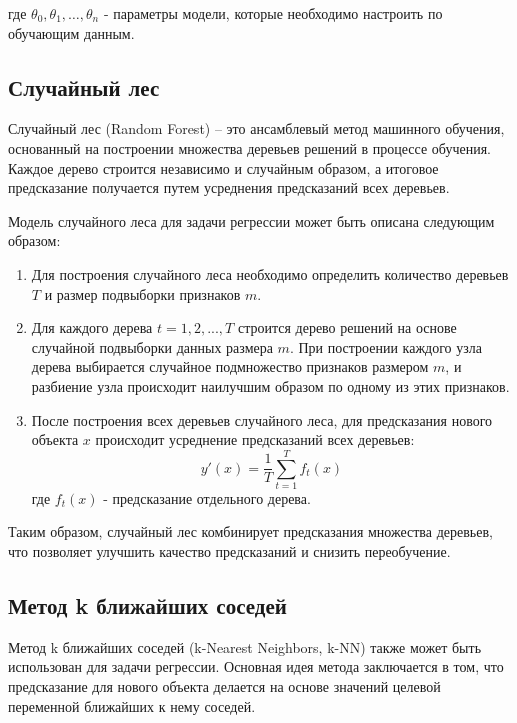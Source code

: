  где $θ_0, θ_1, …, θ_n$ - параметры модели, которые необходимо настроить по обучающим данным.
 
\subsection{Случайный лес}
Случайный лес (Random Forest) -- это ансамблевый метод машинного обучения, основанный на построении множества деревьев решений в процессе обучения. Каждое дерево строится независимо и случайным образом, а итоговое предсказание получается путем усреднения предсказаний всех деревьев.

Модель случайного леса для задачи регрессии может быть описана следующим образом:
\begin{enumerate}
    \item Для построения случайного леса необходимо определить количество деревьев $T$ и размер подвыборки признаков $m$.
    \item Для каждого дерева $t = 1, 2, ..., T$ строится дерево решений на основе случайной подвыборки данных размера $m$. При построении каждого узла дерева выбирается случайное подмножество признаков размером $m$, и разбиение узла происходит наилучшим образом по одному из этих признаков.
    \item После построения всех деревьев случайного леса, для предсказания нового объекта $x$ происходит усреднение предсказаний всех деревьев:
    \begin{equation}
        y'(x) = \frac{1}{T}\sum_{t=1}^T f_t(x)
    \end{equation}
    где $f_t(x)$ - предсказание отдельного дерева.
\end{enumerate}

Таким образом, случайный лес комбинирует предсказания множества деревьев, что позволяет улучшить качество предсказаний и снизить переобучение.

\subsection{Метод k ближайших соседей}
Метод k ближайших соседей (k-Nearest Neighbors, k-NN) также может быть использован для задачи регрессии. Основная идея метода заключается в том, что предсказание для нового объекта делается на основе значений целевой переменной ближайших к нему соседей.

